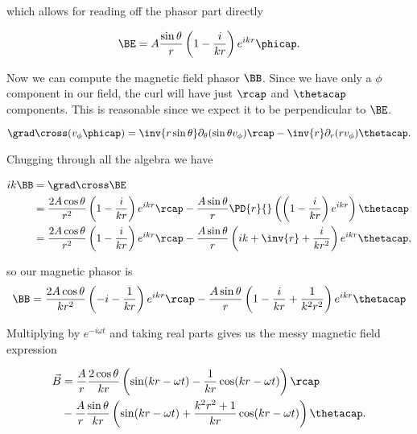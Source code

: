 which allows for reading off the phasor part directly

\begin{equation}\label{eqn:relElectroDynProblemSet4:580}
\BE = A \frac{\sin\theta}{r} \left( 1 - \frac{i}{kr} \right) e^{i k r} \phicap.
\end{equation}

Now we can compute the magnetic field phasor $\BB$.  Since we have only a $\phi$ component in our field, the curl will have just $\rcap$ and $\thetacap$ components.  This is reasonable since we expect it to be perpendicular to $\BE$.

\begin{equation}\label{eqn:relElectroDynProblemSet4:590}
\grad \cross (v_\phi \phicap) 
= \inv{r \sin\theta} \partial_\theta (\sin\theta v_\phi) \rcap
- \inv{r } \partial_r (r v_\phi) \thetacap.
\end{equation}

Chugging through all the algebra we have

\begin{align*}
i k \BB 
&=
\grad \cross \BE \\
&=
\frac{2 A \cos\theta}{r^2} 
\left( 1 - \frac{i}{kr} \right) e^{i k r} 
\rcap
- \frac{A\sin\theta}{r } \PD{r}{} \left( \left( 1 - \frac{i}{kr} \right) e^{i k r} \right)
\thetacap \\
&=
\frac{2 A \cos\theta}{r^2} 
\left( 1 - \frac{i}{kr} \right) e^{i k r} 
\rcap
- \frac{A\sin\theta}{r } \left( i k + \inv{r} + \frac{i}{k r^2} \right) e^{i k r} 
\thetacap,
\end{align*}

so our magnetic phasor is
\begin{equation}\label{eqn:relElectroDynProblemSet4:600}
\BB =
\frac{2 A \cos\theta}{k r^2} 
\left( -i - \frac{1}{kr} \right) e^{i k r} 
\rcap
- \frac{A\sin\theta}{r} \left( 1 - \frac{i}{k r} + \frac{1}{k^2 r^2} \right) e^{i k r} 
\thetacap
\end{equation}

Multiplying by $e^{-i\omega t}$ and taking real parts gives us the messy magnetic field expression

\begin{equation}\label{eqn:relElectroDynProblemSet4:610}
\begin{aligned}
\vec{B} 
&=
\frac{A}{r} \frac{2 \cos\theta}{k r} 
\left( \sin(k r - \omega t)
- \frac{1}{kr} \cos(k r - \omega t) \right)
\rcap \\
&- \frac{A}{r} \frac{\sin\theta}{k r}
\left(
\sin(k r - \omega t)
+ \frac{k^2 r^2 + 1}{k r}
\cos(k r - \omega t)
\right)
\thetacap.
\end{aligned}
\end{equation}

